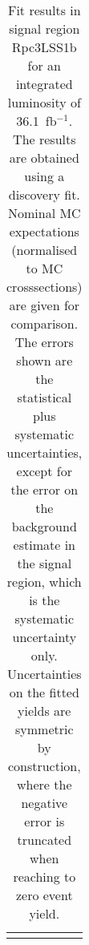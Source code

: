 \begin{table}
\begin{center}
{\begin{tabular*}{\textwidth}{@{\extracolsep{\fill}}lr}
\noalign{\smallskip}\hline\noalign{\smallskip}
\end{tabular*}
}
\end{center}
\caption{Fit results in signal region Rpc3LSS1b for an integrated luminosity of 36.1~fb$^{-1}$.
The results are obtained using a discovery fit. Nominal MC expectations (normalised to MC crosssections) are given for comparison.
The errors shown are the statistical plus systematic uncertainties, except for the error on the background estimate in the signal region, which is the systematic uncertainty only.
Uncertainties on the fitted yields are symmetric by construction, where the negative error is truncated when reaching to zero event yield.
}
\label{table.results.systematics.in.logL.fit..Yields.Rpc3LSS1b}
\end{table}
\clearpage
%